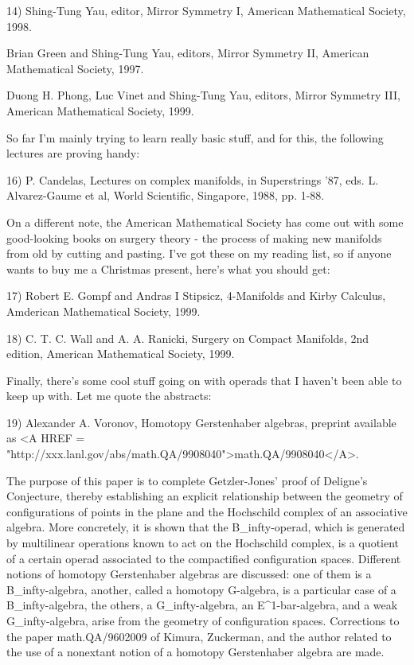 14) Shing-Tung Yau, editor, Mirror Symmetry I, American Mathematical
Society, 1998.

Brian Green and Shing-Tung Yau, editors, Mirror Symmetry II, American
Mathematical Society, 1997.

Duong H. Phong, Luc Vinet and Shing-Tung Yau, editors, Mirror Symmetry III, 
American Mathematical Society, 1999.

So far I'm mainly trying to learn really basic stuff, and for this, 
the following lectures are proving handy:

16) P. Candelas, Lectures on complex manifolds, in Superstrings '87, 
eds. L. Alvarez-Gaume et al, World Scientific, Singapore, 1988, pp. 1-88.

On a different note, the American Mathematical Society has come out
with some good-looking books on surgery theory - the process of making
new manifolds from old by cutting and pasting.  I've got these on
my reading list, so if anyone wants to buy me a Christmas present, 
here's what you should get:

17) Robert E. Gompf and Andras I Stipsicz, 4-Manifolds and Kirby Calculus,
Amderican Mathematical Society, 1999.

18) C. T. C. Wall and A. A. Ranicki, Surgery on Compact Manifolds, 
2nd edition, American Mathematical Society, 1999.

Finally, there's some cool stuff going on with operads that I haven't 
been able to keep up with.  Let me quote the abstracts:

19) Alexander A. Voronov, Homotopy Gerstenhaber algebras, preprint
available as 
<A HREF = "http://xxx.lanl.gov/abs/math.QA/9908040">math.QA/9908040</A>.

The purpose of this paper is to complete Getzler-Jones' proof of Deligne's 
Conjecture, thereby establishing an explicit relationship between the 
geometry of configurations of points in the plane and the Hochschild 
complex of an associative algebra.  More concretely, it is shown that 
the B_infty-operad, which is generated by multilinear operations known to
act on the Hochschild complex, is a quotient of a certain operad associated 
to the compactified configuration spaces.  Different notions of homotopy 
Gerstenhaber algebras are discussed: one of them is a B_infty-algebra, 
another, called a homotopy G-algebra, is a particular case of a 
B_infty-algebra, the others, a G_infty-algebra, an E^1-bar-algebra, and 
a weak G_infty-algebra, arise from the geometry of configuration spaces. 
Corrections to the paper math.QA/9602009 of Kimura, Zuckerman, and the 
author related to the use of a nonextant notion of a homotopy Gerstenhaber 
algebra are made. 

